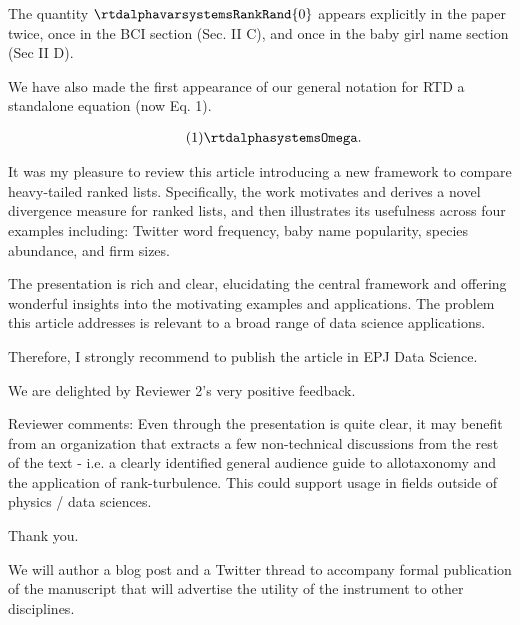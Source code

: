 The quantity $\rtdalphavarsystemsRankRand{0}$
appears explicitly in the paper twice,
once in the BCI section (Sec. II C),
and once in the baby girl name section (Sec II D).


We have also made the first appearance of our general notation for RTD
a standalone equation (now Eq. 1).

\begin{excerpt}
  \begin{gather}
    \tag{1}
    \rtdalphasystemsOmega.
    \label{eq:rankturbdiv.rankturbdiv_defn}
  \end{gather}
\end{excerpt}



\begin{reviewercomment}
  It was my pleasure to review this article introducing a new
  framework to compare heavy-tailed ranked lists.  Specifically, the
  work motivates and derives a novel divergence measure for ranked
  lists, and then illustrates its usefulness across four examples
  including: Twitter word frequency, baby name popularity, species
  abundance, and firm sizes.

  The presentation is rich and clear, elucidating the central
  framework and offering wonderful insights into the motivating
  examples and applications.  The problem this article addresses is
  relevant to a broad range of data science applications.

  Therefore, I strongly recommend to publish the article in EPJ Data
  Science.
\end{reviewercomment}

We are delighted by Reviewer 2's very positive feedback.

\begin{reviewercomment}
  Reviewer comments: Even through the presentation is quite clear, it
  may benefit from an organization that extracts a few non-technical
  discussions from the rest of the text - i.e. a clearly identified
  general audience guide to allotaxonomy and the application of
  rank-turbulence.  This could support usage in fields outside of
  physics / data sciences.
\end{reviewercomment}

Thank you.

We will author a blog post and a Twitter thread to accompany
formal publication of the
manuscript that will advertise the utility of the instrument to other
disciplines.

